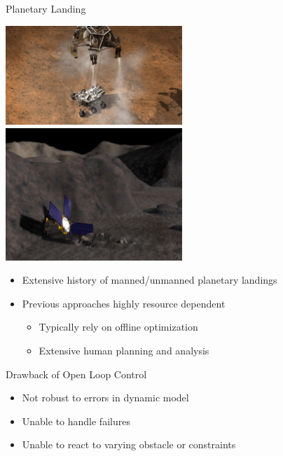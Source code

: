 \begin{frame}[t]{Planetary Landing} %
\begin{center}
    \includegraphics[width=0.5\textwidth,height=0.3\textheight,keepaspectratio]{figures/curiosity.jpg} ~
    \includegraphics[width=0.5\textwidth,height=0.3\textheight,keepaspectratio]{figures/430_new_landingnearstill.jpg}
\end{center}

\begin{itemize}
    \item Extensive history of manned/unmanned planetary landings
    \pause
    \item Previous approaches highly resource dependent
    \begin{itemize}
        \item Typically rely on offline optimization
        \item Extensive human planning and analysis
    \end{itemize}
\end{itemize}
\pause
\begin{block}{Drawback of Open Loop Control}
    \begin{itemize}
        \item Not robust to errors in dynamic model
        \item Unable to handle failures
        \item Unable to react to varying obstacle or constraints
    \end{itemize}
\end{block}
\end{frame} %
